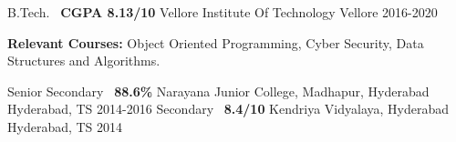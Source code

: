 \begin{cventries}
  \cventry
    { B.Tech. \textbar\ \textbf{CGPA 8.13/10} }
    { Vellore Institute Of Technology }
    { Vellore }
    { 2016-2020 }
    {
      \begin{cvitems}
        \item {\textbf{Relevant Courses:} Object Oriented Programming, Cyber Security, Data Structures and Algorithms.}
      \end{cvitems}
    }
  \cventry
    { Senior Secondary \textbar\ \textbf{88.6\%} }
    { Narayana Junior College, Madhapur, Hyderabad }
    { Hyderabad, TS }
    { 2014-2016 }
    {}
  \cventry
    { Secondary \textbar\ \textbf{8.4/10}}
    { Kendriya Vidyalaya, Hyderabad }
    { Hyderabad, TS }
    { 2014 }
    {}
\end{cventries}
